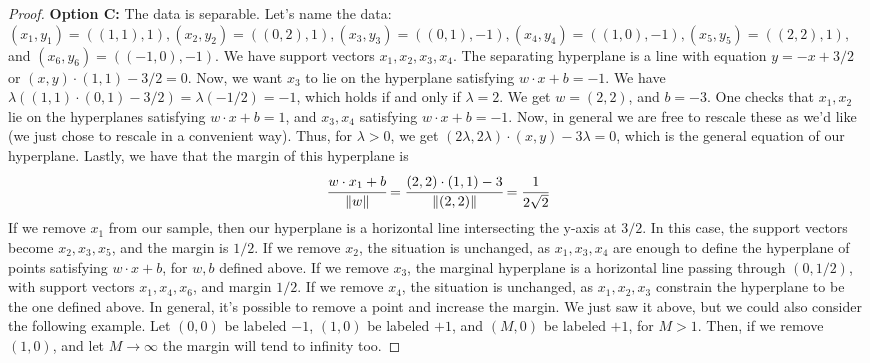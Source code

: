 \documentclass[12pt]{article}
\newcommand{\norm}[1]{\lVert #1 \rVert}
\begin{document}
\begin{proof}
  \bigbreak
  \textbf{ Option C:} \bigbreak
  The data is separable. Let's name the data: $(x_1,y_1) = ((1,1),1), (x_2, y_2) = ((0,2),1), (x_3,y_3) = ((0,1), -1), (x_4,y_4) =  ((1,0), -1), (x_5,y_5) = ((2,2),1), $ and $ (x_6,y_6) = ((-1,0), -1)$.
  We have support vectors $x_1, x_2, x_3, x_4$. The separating hyperplane is a line with equation $y=-x+3/2$ or $(x,y) \cdot (1,1) - 3/2 = 0 $. Now, we want $x_3$ to lie on the hyperplane
  satisfying $w \cdot x + b = -1$. We have $\lambda((1,1) \cdot (0,1) - 3/2) = \lambda ( - 1/2) = -1$, which holds if and only if $\lambda = 2$. We get $w = (2,2)$, and $b = -3$. One checks that $x_1, x_2$ lie on the hyperplanes satisfying
  $w \cdot x + b = 1$, and $x_3, x_4$ satisfying $w \cdot x + b = -1$. Now, in general we are free to rescale these as we'd like (we just chose to rescale in a convenient way).
  Thus, for $\lambda > 0$, we get $ (2\lambda, 2\lambda) \cdot (x,y) - 3 \lambda = 0$, which is the general equation of our hyperplane. Lastly, we have that the margin of this hyperplane is
  \begin{align*}
    \cfrac{w \cdot x_1 + b}{\norm{w}} = \cfrac{(2,2) \cdot (1,1) - 3}{\norm{(2,2)}} = \cfrac{1}{2\sqrt{2}} 
  \end{align*}
  If we remove $x_1$ from our sample, then our hyperplane is a horizontal line intersecting the y-axis at $3/2$. In this case,
  the support vectors become $x_2, x_3, x_5$, and the margin is $1/2$. If we remove $x_2$, the situation is unchanged, as $x_1, x_3, x_4$ are enough to define the hyperplane of points satisfying $w \cdot x + b$, for $w, b$ defined above. If we remove $x_3$, the marginal hyperplane is a horizontal line passing through $(0, 1/2)$, with support vectors $x_1, x_4, x_6 $, and margin $1/2$. If we remove $x_4$, the situation is unchanged, as $x_1, x_2, x_3$ constrain the hyperplane to be the one defined above. In general, it's possible to remove a point and increase the margin. We just saw it above, but we could also consider the following example. Let $(0,0)$ be labeled $-1$, $(1,0)$ be labeled $+1$, and $(M,0)$ be labeled $+1$, for $M>1$. Then, if we remove $(1,0)$, and let $M \to \infty$ the margin will tend to infinity too.
\end{proof}
\end{document}
